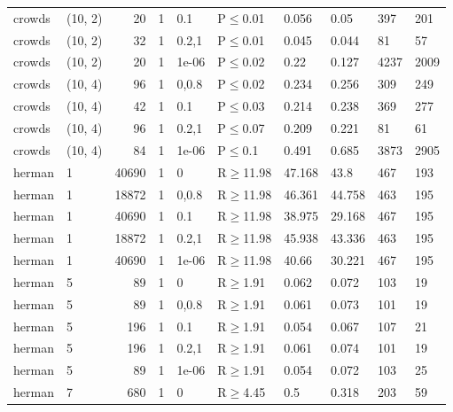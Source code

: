 \begin{longtable}{llrrllllll}
 crowds        & (10, 2)  &     	20 & 1 & 0.1   & P$\leq$0.01  & 0.056   & 0.05     & 397    & 201    \\
 crowds        & (10, 2)  &     	32 & 1 & 0.2,1 & P$\leq$0.01  & 0.045   & 0.044    & 81     & 57     \\
 crowds        & (10, 2)  &     	20 & 1 & 1e-06 & P$\leq$0.02  & 0.22    & 0.127    & 4237   & 2009   \\
 crowds        & (10, 4)  &     	96 & 1 & 0,0.8 & P$\leq$0.02  & 0.234   & 0.256    & 309    & 249    \\
 crowds        & (10, 4)  &     	42 & 1 & 0.1   & P$\leq$0.03  & 0.214   & 0.238    & 369    & 277    \\
 crowds        & (10, 4)  &     	96 & 1 & 0.2,1 & P$\leq$0.07  & 0.209   & 0.221    & 81     & 61     \\
 crowds        & (10, 4)  &     	84 & 1 & 1e-06 & P$\leq$0.1   & 0.491   & 0.685    & 3873   & 2905   \\
 herman        & 1        &  	40690 & 1 & 0     & R$\geq$11.98 & 47.168  & 43.8     & 467    & 193    \\
 herman        & 1        &  	18872 & 1 & 0,0.8 & R$\geq$11.98 & 46.361  & 44.758   & 463    & 195    \\
 herman        & 1        &  	40690 & 1 & 0.1   & R$\geq$11.98 & 38.975  & 29.168   & 467    & 195    \\
 herman        & 1        &  	18872 & 1 & 0.2,1 & R$\geq$11.98 & 45.938  & 43.336   & 463    & 195    \\
 herman        & 1        &  	40690 & 1 & 1e-06 & R$\geq$11.98 & 40.66   & 30.221   & 467    & 195    \\
 herman        & 5        &     	89 & 1 & 0     & R$\geq$1.91  & 0.062   & 0.072    & 103    & 19     \\
 herman        & 5        &     	89 & 1 & 0,0.8 & R$\geq$1.91  & 0.061   & 0.073    & 101    & 19     \\
 herman        & 5        &    	196 & 1 & 0.1   & R$\geq$1.91  & 0.054   & 0.067    & 107    & 21     \\
 herman        & 5        &    	196 & 1 & 0.2,1 & R$\geq$1.91  & 0.061   & 0.074    & 101    & 19     \\
 herman        & 5        &     	89 & 1 & 1e-06 & R$\geq$1.91  & 0.054   & 0.072    & 103    & 25     \\
 herman        & 7        &    	680 & 1 & 0     & R$\geq$4.45  & 0.5     & 0.318    & 203    & 59     \\

\end{longtable}
